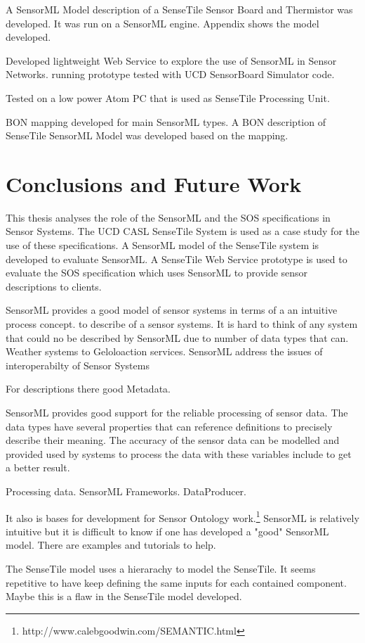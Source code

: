 \documentclass[]{final_report}
\begin{document}
A  SensorML Model description of a SenseTile Sensor Board and Thermistor was developed. It was
run on a SensorML engine. Appendix shows the model developed.

Developed lightweight Web Service to explore the use of SensorML in Sensor Networks.
running prototype tested with UCD SensorBoard Simulator code.

Tested on a low power Atom PC that is used as SenseTile Processing Unit.

BON mapping developed for main SensorML types. A BON description of SenseTile SensorML Model
was developed based on the mapping.

\chapter{ Conclusions and Future Work}
This thesis analyses the role of the SensorML and the SOS specifications in Sensor Systems. The UCD CASL SenseTile System is used as a case study for the use of these specifications. A SensorML model of the SenseTile system is developed to evaluate SensorML. A SenseTile Web Service prototype is used to evaluate the SOS specification which uses SensorML to provide sensor descriptions to clients. 


SensorML provides a good model of sensor systems in terms of a an intuitive process concept.  to describe of a sensor systems. It is hard to think of any system that could no be described by SensorML due to number of data types that can. Weather systems to Geloloaction services. SensorML address the issues of interoperabilty of Sensor Systems

For descriptions there good Metadata.

SensorML provides good support for the reliable processing of sensor data. The data types have several properties that can reference definitions to precisely describe their meaning.  The accuracy of the sensor data can be modelled and provided used by systems to process the data with these variables include to get a better result.

Processing data. 
SensorML Frameworks. DataProducer.


It also is bases for development for Sensor Ontology work.\footnote{http://www.calebgoodwin.com/SEMANTIC.html}
SensorML is relatively intuitive but it is difficult to know if one has developed a "good" SensorML model. There are examples and tutorials to help. 

The SenseTile model uses a hierarachy to model the SenseTile. It seems repetitive to have keep defining the same inputs for each contained component. Maybe this is a flaw in the SenseTile model developed.
\end{document}
